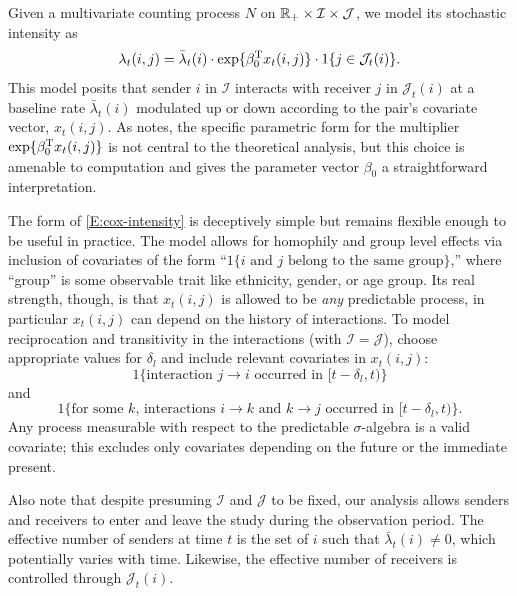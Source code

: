 \documentclass[final]{statsoc}
\begin{document}
Given a multivariate counting process $N$ on
$\mathbb{R}_+ \times \mathcal{I} \times \mathcal{J}$,
we model its stochastic intensity as
\begin{equation}\label{E:cox-intensity}
    \lambda_t(i,j)
        =
        \bar \lambda_t(i)
        \cdot
        \exp\{ \beta_0^{\mathrm{T}} x_t(i, j) \}
        \cdot
        1{\{j \in \mathcal{J}_t(i)\}}.
\end{equation}
This model posits that sender $i$ in $\mathcal{I}$ interacts  with receiver $j$
in $\mathcal{J}_t(i)$ at a baseline rate $\bar \lambda_t(i)$ modulated up or
down according to the pair's covariate vector, $x_t(i,j)$.  As
\citet{efron1977efficiency} notes, the specific parametric form for the multiplier
$\exp\{ \beta_0^{\mathrm{T}} x_t(i,j) \}$ is not central to the theoretical
analysis, but this choice is amenable to computation and gives
the parameter vector $\beta_0$ a straightforward interpretation.

The form of \eqref{E:cox-intensity} is deceptively simple but remains
flexible enough to be useful in practice.  The model allows for
homophily and group level effects via inclusion of covariates of the form
``$1\{\text{$i$ and $j$ belong to the same group}\}$,'' where ``group'' is
some observable trait like ethnicity, gender, or age group.  Its real
strength, though, is that $x_t(i,j)$ is allowed to be \emph{any}
predictable process, in particular $x_t(i,j)$ can depend on the history
of interactions.  To model reciprocation and transitivity in the
interactions  (with $\mathcal{I} = \mathcal{J}$), choose appropriate
values for $\delta_l$ and include relevant covariates in $x_t(i,j)$:
\[
    1\{\text{interaction $j \to i$ occurred in $[t - \delta_l,t)$}\}
\]
and
\[
    1\{\text{for some $k$, interactions $i\to k$ and $k \to j$ occurred in
             $[t - \delta_l, t)$}\}.
\]
Any process measurable with respect to the predictable $\sigma$-algebra is
a valid covariate; this excludes only covariates depending on the future
or the immediate present.

Also note that despite presuming $\mathcal{I}$ and $\mathcal{J}$ to be fixed,
our analysis
allows senders and receivers to enter and leave the study during the
observation period.  The effective number of senders at time $t$ is the
set of $i$ such that $\bar \lambda_t(i) \neq 0$, which potentially varies
with time.  Likewise, the effective number of receivers is controlled through
$\mathcal{J}_t(i)$.
\end{document}
